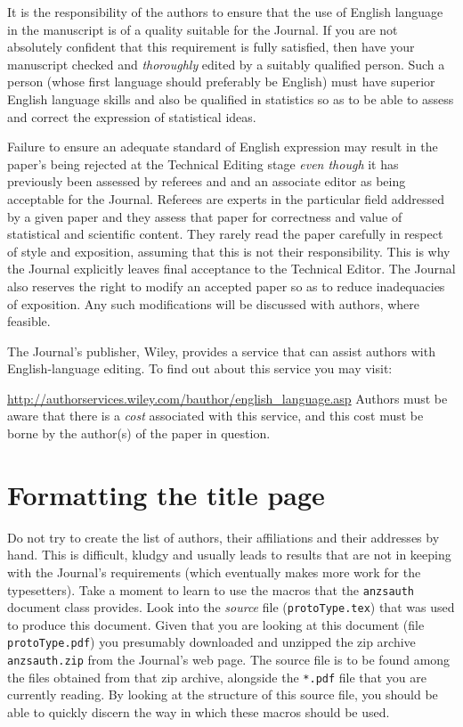 \documentclass[times, doublespace]{anzsauth}
\begin{document}
It is the responsibility of the authors to ensure that the use
of English language in the manuscript is of a quality suitable
for the Journal. If you are not absolutely confident that this
requirement is fully satisfied, then have your manuscript checked
and \emph{thoroughly} edited by a suitably qualified person.
Such a person (whose first language should preferably be English)
must have superior English language skills and also be qualified
in statistics so as to be able to assess and correct the expression
of statistical ideas.

Failure to ensure an adequate standard of English expression may
result in the paper's being rejected at the Technical Editing stage
\emph{even though} it has previously been assessed by referees
and and an associate editor as being acceptable for the Journal.
Referees are experts in the particular field addressed by a given
paper and they assess that paper for correctness and value of
statistical and scientific content. They rarely read the paper
carefully in respect of style and exposition, assuming that this is
not their responsibility.  This is why the Journal explicitly leaves
final acceptance to the Technical Editor.  The Journal also reserves
the right to modify an accepted paper so as to reduce inadequacies of
exposition.  Any such modifications will be discussed with authors,
where feasible.

The Journal's publisher, Wiley, provides a service that can assist
authors with English-language editing.  To find out about this
service you may visit:

{\small
\url{http://authorservices.wiley.com/bauthor/english_language.asp}
}
\noindent
Authors must be aware that there is a \emph{cost} associated with
this service, and this cost must be borne by the author(s) of the
paper in question.

\section{Formatting the title page}
\label{sec:titPage}

Do not try to create the list of authors, their affiliations
and their addresses by hand.  This is difficult, kludgy and
usually leads to results that are not in keeping with the
Journal's requirements (which eventually makes more work for
the typesetters).  Take a moment to learn to use the macros
that the \texttt{anzsauth} document class provides.  Look into
the \emph{source} file (\texttt{protoType.tex}) that was used to
produce this document.  Given that you are looking at this document
(file \texttt{protoType.pdf}) you presumably downloaded and unzipped
the zip archive \texttt{anzsauth.zip} from the Journal's web page.
The source file is to be found among the files obtained from
that zip archive, alongside the \texttt{*.pdf} file that you are
currently reading.  By looking at the structure of this source file,
you should be able to quickly discern the way in which these macros
should be used.
\end{document}
